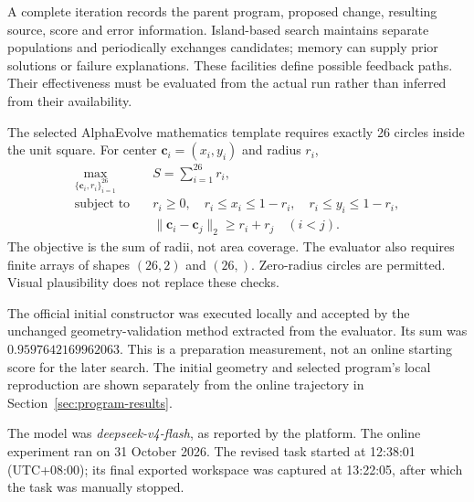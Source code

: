 A complete iteration records the parent program, proposed change, resulting source, score and error information. Island-based search maintains separate populations and periodically exchanges candidates; memory can supply prior solutions or failure explanations.\cite{dataflow,islands,memory} These facilities define possible feedback paths. Their effectiveness must be evaluated from the actual run rather than inferred from their availability.

The selected AlphaEvolve mathematics template requires exactly 26 circles inside the unit square.\cite{benchmark,circle} For center $\boldsymbol c_i=(x_i,y_i)$ and radius $r_i$,
\begin{align}
\max_{\{\boldsymbol c_i,r_i\}_{i=1}^{26}}\quad&
S=\sum_{i=1}^{26}r_i,\label{eq:circle-objective}\\
\text{subject to}\quad&
r_i\ge0,\quad r_i\le x_i\le1-r_i,\quad r_i\le y_i\le1-r_i,\label{eq:circle-boundary}\\
&\|\boldsymbol c_i-\boldsymbol c_j\|_2\ge r_i+r_j\quad(i<j).\label{eq:circle-pairs}
\end{align}
The objective is the sum of radii, not area coverage. The evaluator also requires finite arrays of shapes $(26,2)$ and $(26,)$. Zero-radius circles are permitted. Visual plausibility does not replace these checks.

The official initial constructor was executed locally and accepted by the unchanged geometry-validation method extracted from the evaluator. Its sum was $0.9597642169962063$. This is a preparation measurement, not an online starting score for the later search. The initial geometry and selected program's local reproduction are shown separately from the online trajectory in Section~\ref{sec:program-results}.

The model was \emph{deepseek-v4-flash}, as reported by the platform. The online experiment ran on 31 October 2026. The revised task started at 12:38:01 (UTC+08:00); its final exported workspace was captured at 13:22:05, after which the task was manually stopped.

